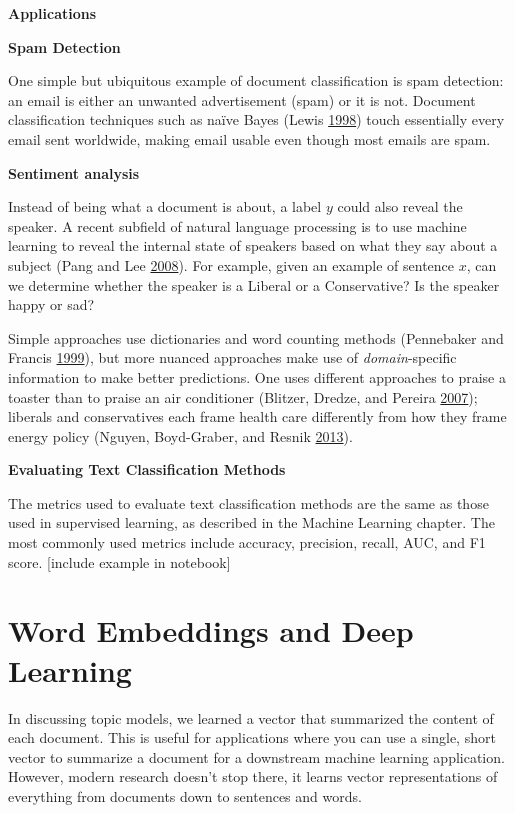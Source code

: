 \documentclass[]{krantz}
\begin{document}
\textbf{Applications}

\textbf{Spam Detection}

One simple but ubiquitous example of document classification is spam
detection: an email is either an unwanted advertisement (spam) or it is
not. Document classification techniques such as naïve Bayes (Lewis
\protect\hyperlink{ref-lewis-05}{1998}) touch essentially every email
sent worldwide, making email usable even though most emails are spam.

\textbf{Sentiment analysis}

Instead of being what a document is about, a label \(y\) could also
reveal the speaker. A recent subfield of natural language processing is
to use machine learning to reveal the internal state of speakers based
on what they say about a subject (Pang and Lee
\protect\hyperlink{ref-pang-08}{2008}). For example, given an example of
sentence \(x\), can we determine whether the speaker is a Liberal or a
Conservative? Is the speaker happy or sad?

Simple approaches use dictionaries and word counting methods (Pennebaker
and Francis \protect\hyperlink{ref-pennebaker-99}{1999}), but more
nuanced approaches make use of \emph{domain}-specific information to
make better predictions. One uses different approaches to praise a
toaster than to praise an air conditioner (Blitzer, Dredze, and Pereira
\protect\hyperlink{ref-blitzer-07}{2007}); liberals and conservatives
each frame health care differently from how they frame energy policy
(Nguyen, Boyd-Graber, and Resnik
\protect\hyperlink{ref-nguyen-13:shlda}{2013}).

\textbf{Evaluating Text Classification Methods}

The metrics used to evaluate text classification methods are the same as
those used in supervised learning, as described in the Machine Learning
chapter. The most commonly used metrics include accuracy, precision,
recall, AUC, and F1 score. {[}include example in notebook{]}

\section{Word Embeddings and Deep
Learning}\label{word-embeddings-and-deep-learning}

In discussing topic models, we learned a vector that summarized the
content of each document. This is useful for applications where you can
use a single, short vector to summarize a document for a downstream
machine learning application. However, modern research doesn't stop
there, it learns vector representations of everything from documents
down to sentences and words.
\end{document}

